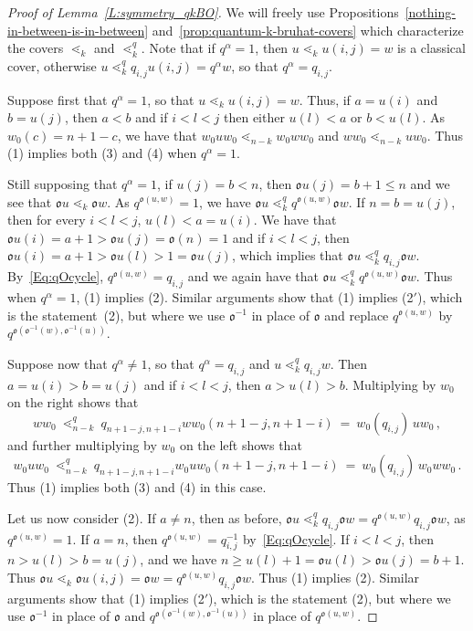 \documentclass[11pt]{article}
\theoremstyle{definition}
\numberwithin{equation}{section}
\newcommand{\ncycle}{\mathfrak o}
\begin{document}
\begin{proof}[Proof of Lemma~\ref{L:symmetry_qkBO}]
 We will freely use Propositions~\ref{nothing-in-between-is-in-between} and~\ref{prop:quantum-k-bruhat-covers} which
 characterize the covers $\lessdot_k$ and $\lessdot_k^q$.
 Note that if $q^\alpha=1$, then $u\lessdot_k u(i,j)=w$ is a classical cover, otherwise
 $u\lessdot_k^q  q_{i,j}u(i,j)=q^\alpha w$, so that $q^\alpha=q_{i,j}$.
 
 Suppose first that  $q^\alpha=1$, so that $u\lessdot_k u(i,j)=w$.
 Thus, if $a=u(i)$ and $b=u(j)$, then $a<b$ and if $i<l<j$ then either $u(l)<a$ or $b<u(l)$.
 As $w_0(c)=n{+}1{-}c$, we have that $w_0u w_0 \lessdot_{n-k} w_0 w w_0$ and  $w w_0 \lessdot_{n-k} u w_0$.
 Thus (1) implies both (3) and (4) when $q^\alpha=1$.


 Still supposing that $q^\alpha=1$, if $u(j)=b<n$, then $\ncycle u(j)=b+1\leq n$ and we see that 
 $\ncycle u \lessdot_k \ncycle w$.
 As $q^{\ncycle(u,w)}=1$, we have $\ncycle u \lessdot^q_k q^{\ncycle(u,w)} \ncycle w$.
 If $n=b=u(j)$, then for every $i<l<j$, $u(l)<a=u(i)$.
 We have that $\ncycle u(i)=a+1>\ncycle u(j)=\ncycle(n)=1$ and if  $i<l<j$, then
 $\ncycle u(i)=a{+}1>\ncycle u(l)>1=\ncycle u(j)$, which implies that $\ncycle u \lessdot^q_k q_{i,j} \ncycle w$.
 By~\eqref{Eq:qOcycle}, $q^{\ncycle(u,w)}=q_{i,j}$ and we again have that $\ncycle u \lessdot^q_k q^{\ncycle(u,w)} \ncycle w$.
 Thus when $q^\alpha=1$, (1) implies (2).
 Similar arguments show that (1) implies (2$'$), which is the statement~(2), but where we use $\ncycle^{-1}$ in place of
 $\ncycle$ and replace $q^{\ncycle(u,w)}$ by $q^{\ncycle(\ncycle^{-1}(w),\ncycle^{-1}(u))}$. 

 Suppose now that $q^\alpha\neq 1$, so that $q^\alpha=q_{i,j}$ and $u\lessdot^q_k q_{i,j} w$.
 Then $a=u(i)>b=u(j)$ and if $i<l<j$, then $a>u(l)>b$.
 Multiplying by $w_0$ on the right shows that
 \[
     w w_0\ \lessdot^q_{n-k}\ q_{n+1-j,n+1-i} w w_0 (n{+}1-j,n{+}1-i)\ =\  w_0(q_{i,j})\, u w_0\,,
 \]
 and further multiplying by $w_0$ on the left shows that
 \[
    w_0uw_0\  \lessdot^q_{n-k}\  q_{n+1-j,n+1-i} w_0 u w_0  (n{+}1-j,n{+}1-i)\ =\   w_0(q_{i,j})\, w_0 w w_0\,.
 \]
 Thus (1) implies both (3) and (4) in this case.

 Let us now consider (2).
 If $a\neq n$, then as before, $\ncycle u \lessdot_k^q  q_{i,j}\ncycle w=q^{\ncycle(u,w)} q_{i,j}\ncycle w$, as $q^{\ncycle(u,w)}=1$.
 If $a=n$, then $q^{\ncycle(u,w)}=q_{i,j}^{-1}$ by~\eqref{Eq:qOcycle}.
 If $i<l<j$, then $n>u(l)>b=u(j)$, and we have $n\geq u(l)+1 = \ncycle u(l)>\ncycle u(j)=b+1$.
 Thus $\ncycle u \lessdot_k \ncycle u(i,j)=\ncycle w= q^{\ncycle(u,w)} q_{i,j} \ncycle w$.
 Thus (1) implies (2).
 Similar arguments show that (1) implies (2$'$), which is the statement (2), but where we use $\ncycle^{-1}$ in place of
 $\ncycle$ and  $q^{\ncycle(\ncycle^{-1}(w),\ncycle^{-1}(u))}$ in place of $q^{\ncycle(u,w)}$. 


\end{proof}
\end{document}
